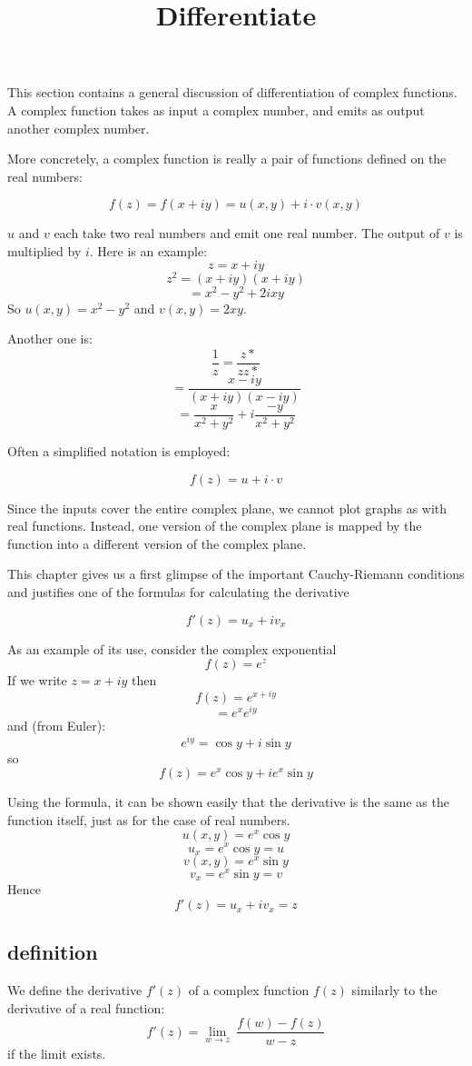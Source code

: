 \documentclass[11pt, oneside]{article}
\title{Differentiate}
\date{}
\begin{document}
\maketitle
\Large

This section contains a general discussion of differentiation of complex functions.  A complex function takes as input a complex number, and emits as output another complex number.  

More concretely, a complex function is really a pair of functions defined on the real numbers:

\[ f(z) = f(x + iy) = u(x,y) + i \cdot v(x,y) \]

$u$ and $v$ each take two real numbers and emit one real number.  The output of $v$ is multiplied by $i$.  Here is an example:
\[ z = x + iy \]
\[ z^2 = (x + iy)(x + iy) \]
\[ = x^2 - y^2 + 2ixy \]
So $u(x,y) = x^2 - y^2$ and $v(x,y) = 2xy$.

Another one is:
\[ \frac{1}{z} = \frac{z*}{zz*} \]
\[ = \frac{x - iy}{(x + iy)(x - iy)} \]
\[ = \frac{x}{x^2 + y^2} + i \frac{-y}{x^2 + y^2} \]

Often a simplified notation is employed:

\[ f(z) = u + i \cdot v \]

Since the inputs cover the entire complex plane, we cannot plot graphs as with real functions.  Instead, one version of the complex plane is mapped by the function into a different version of the complex plane.

This chapter gives us a first glimpse of the important Cauchy-Riemann conditions and justifies one of the formulas for calculating the derivative

\[ f'(z) = u_x + i v_x \]

As an example of its use, consider the complex exponential
\[ f(z) = e^z \]
If we write $z = x + iy$ then
\[ f(z) = e^{x + iy} \]
\[ = e^x e^{iy} \]
and (from Euler):
\[ e^{iy} = \cos y + i \sin y \]
so
\[ f(z) = e^x \cos y + i e^x \sin y \]

Using the formula, it can be shown easily that the derivative is the same as the function itself, just as for the case of real numbers.
\[ u(x,y) = e^x \cos y \]
\[ u_x = e^x \cos y = u \]
\[ v(x,y) = e^x \sin y \]
\[ v_x = e^x \sin y = v \]
Hence
\[f'(z) = u_x + iv_x = z \]

\subsection*{definition}
We define the derivative $f'(z)$ of a complex function $f(z)$ similarly to the derivative of a real function:
\[ f'(z) = \lim_{w \rightarrow z} \ \frac{f(w) - f(z)}{w-z} \]
if the limit exists.
\end{document}

